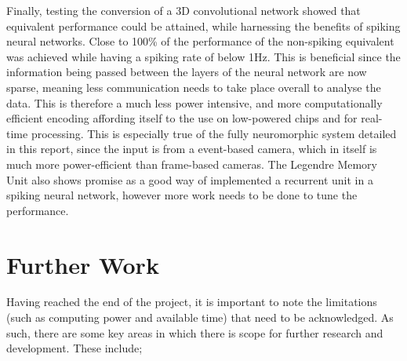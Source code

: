 Finally, testing the conversion of a 3D convolutional network showed that equivalent performance could be attained, while harnessing the benefits of spiking neural networks. Close to 100\% of the performance of the non-spiking equivalent was achieved while having a spiking rate of below 1Hz. This is beneficial since the information being passed between the layers of the neural network are now sparse, meaning less communication needs to take place overall to analyse the data. This is therefore a much less power intensive, and more computationally efficient encoding affording itself to the use on low-powered chips and for real-time processing. This is especially true of the fully neuromorphic system detailed in this report, since the input is from a event-based camera, which in itself is much more power-efficient than frame-based cameras. The Legendre Memory Unit also shows promise as a good way of implemented a recurrent unit in a spiking neural network, however more work needs to be done to tune the performance.

\section{Further Work}

Having reached the end of the project, it is important to note the limitations (such as computing power and available time) that need to be acknowledged. As such, there are some key areas in which there is scope for further research and development. These include;

